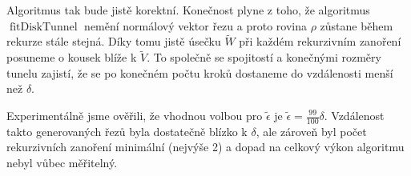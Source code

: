 Algoritmus tak bude jistě korektní. Konečnost plyne z toho, že
algoritmus $\operatorname{fitDiskTunnel} $ nemění normálový vektor řezu a proto
rovina $ \rho $ zůstane během rekurze stále stejná. Díky tomu jistě úsečku
$ \widetilde{W} $ při každém rekurzivním zanoření posuneme o kousek blíže k
$ \widetilde{V} $. To společně se spojitostí a konečnými rozměry tunelu zajistí,
že se po konečném počtu kroků dostaneme do vzdálenosti menší než $ \delta $.

Experimentálně jsme ověřili, že vhodnou volbou pro $ \tilde{\epsilon} $ je
$ \tilde{\epsilon} = \frac{99}{100} \delta$. Vzdálenost takto generovaných řezů
byla dostatečně blízko k $ \delta $, ale zároveň byl počet rekurzivních zanoření
minimální (nejvýše 2) a dopad na celkový výkon algoritmu nebyl vůbec měřitelný.

